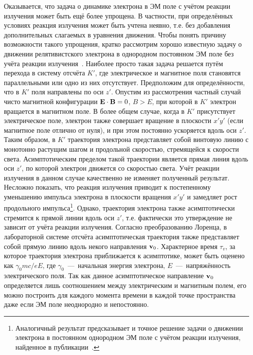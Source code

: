Оказывается, что задача о динамике электрона в ЭМ поле с учётом реакции излучения может быть ещё более упрощена.
В частности, при определённых условиях реакция излучения может быть учтена неявно, т.е. без добавления дополнительных слагаемых в уравнения движения.
Чтобы понять причину возможности такого упрощения, кратко рассмотрим хорошо известную задачу о движении релятивистского электрона в однородном постоянном ЭМ поле без учёта реакции излучения~\cite{LandauII}.
Наиболее просто такая задача решается путём перехода в систему отсчёта $K'$, где электрическое и магнитное поля становятся параллельными или одно из них отсутствует.
Предположим для определённости, что в $K'$ поля направлены по оси $z'$.
Опустим из рассмотрения частный случай чисто магнитной конфигурации ${\vb{E} \cdot \vb{B}=0}$, $B>E$, при которой в $K'$ электрон вращается в магнитном поле.
В более общем случае, когда в $K'$ присутствует электрическое поле, электрон также совершает вращение в плоскости $x'y'$ (если магнитное поле отлично от нуля), и при этом постоянно ускоряется вдоль оси $z'$.
Таким образом, в $K'$ траектория электрона представляет собой винтовую линию с монотонно растущим шагом и продольной скоростью, стремящейся к скорости света.
Асимптотическим пределом такой траектории является прямая линия вдоль оси $z'$, по которой электрон движется со скоростью света.
Учёт реакции излучения в данном случае качественно не изменяет полученный результат.
Несложно показать, что реакция излучения приводит к постепенному уменьшению импульса электрона в плоскости вращения $x'y'$ и замедляет рост продольного импульса\footnote{Аналогичный результат предсказывает и точное решение задачи о движении электрона в постоянном однородном ЭМ поле с учётом реакции излучения, найденное в публикации~\cite{heintzmann1973exact}.}.
Однако, траектория электрона также асимптотически стремится к прямой линии вдоль оси $z'$, т.е. фактически это утверждение не зависит от учёта реакции излучения.
Согласно преобразованию Лоренца, в лабораторной системе отсчёта асимптотическая траектория также представляет собой прямую линию вдоль некого направления $\vb{v}_0$.
Характерное время $\tau_v$, за которое траектория электрона приближается к асимптотике, может быть оценено как $\gamma_0 mc/eE$, где $\gamma_0$~---~начальная энергия электрона, $E$~---~напряжённость электрического поля.
Так как данное асимптотическое направление $\vb{v}_0$ определяется лишь соотношением между электрическим и магнитным полем, его можно построить для каждого момента времени в каждой точке пространства даже если ЭМ поле неоднородно и непостоянно.
